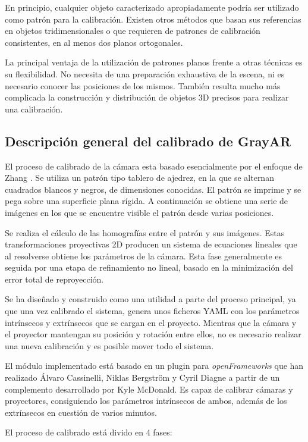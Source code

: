 En principio, cualquier objeto caracterizado apropiadamente podría ser utilizado como patrón para la calibración. Existen otros métodos que basan sus referencias en objetos tridimensionales o que requieren de patrones de calibración consistentes, en al menos dos planos ortogonales. 

La principal ventaja de la utilización de patrones planos frente a otras técnicas es su flexibilidad. No necesita de una preparación exhaustiva de la escena, ni es necesario conocer las posiciones de los mismos. También resulta mucho más complicada la construcción y distribución de objetos 3D precisos para realizar una calibración.

\subsection{Descripción general del calibrado de GrayAR}
El proceso de calibrado de la cámara esta basado esencialmente por el enfoque de Zhang \cite{Zhang}. Se utiliza un patrón tipo tablero de ajedrez, en la que se alternan cuadrados blancos y negros, de dimensiones conocidas. El patrón se imprime y se pega sobre una superficie plana rígida. A continuación se obtiene una serie de imágenes en los que se encuentre visible el patrón desde varias posiciones. 

Se realiza el cálculo de las homografías entre el patrón y sus imágenes. Estas transformaciones proyectivas 2D producen un sistema de ecuaciones lineales que al resolverse obtiene los parámetros de la cámara. Esta fase generalmente es seguida por una etapa de refinamiento no lineal, basado en la minimización del error total de reproyección.

Se ha diseñado y construido como una utilidad a parte del proceso principal, ya que una vez calibrado el sistema, genera unos ficheros YAML con los parámetros intrínsecos y extrínsecos que se cargan en el proyecto. Mientras que la cámara y el proyector mantengan su posición y rotación entre ellos, no es necesario realizar una nueva calibración y es posible mover todo el sistema.

El módulo implementado está basado en un plugin para \textit{openFrameworks} que han realizado Álvaro Cassinelli, Niklas Bergström y Cyril Diagne a partir de un complemento desarrollado por Kyle McDonald. Es capaz de calibrar cámaras y proyectores, consiguiendo los parámetros intrínsecos de ambos, además de los extrínsecos en cuestión de varios minutos. 

El proceso de calibrado está divido en 4 fases:

